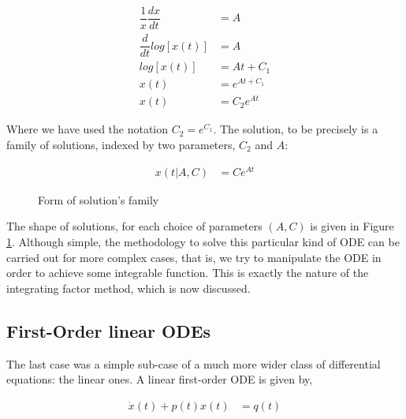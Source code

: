 \documentclass[12pt]{article}
\begin{document}
		\begin{align}
		\dfrac{1}{x}\dfrac{dx}{dt} &= A\\
		\dfrac{d}{dt}log[x(t)] &= A\\
		log[x(t)] &= At + C_{1}\\
		x(t) &= e^{At + C_{1}}\\
		x(t) &= C_{2}e^{At}
		\end{align}
		
		Where we have used the notation $C_{2} = e^{C_{1}}$. The solution, to be precisely is a family of solutions, indexed by two parameters, $C_{2}$ and $A$:
		
		\begin{align}
		x(t|A,C) &= Ce^{At}
		\end{align}			
		
		\begin{figure}[H]
			\centering
			\caption{Form of solution's family}
			\label{Figure 4}
		\end{figure}
		
		The shape of solutions, for each choice of parameters $(A,C)$ is given in Figure \ref{Figure 4}. Although simple, the methodology to solve this particular kind of ODE can be carried out for more complex cases, that is, we try to manipulate the ODE in order to achieve some integrable function. This is exactly the nature of the integrating factor method, which is now discussed.
		
		\subsection{First-Order linear ODEs}
		The last case was a simple sub-case of a much more wider class of differential equations: the linear ones. A linear first-order ODE is given by,
		
		\begin{align}
		\dot{x}(t) + p(t)x(t) &= q(t)
		\end{align}
		
\end{document}
